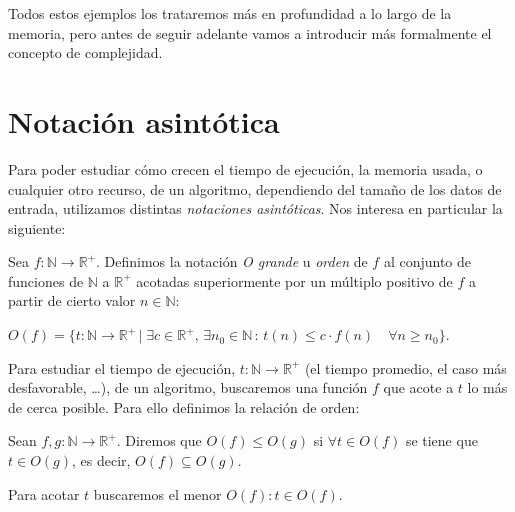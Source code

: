 Todos estos ejemplos los trataremos m\'as en profundidad a lo largo de la memoria, pero antes de seguir adelante vamos a introducir m\'as formalmente el concepto de complejidad.

\hfil

\section{Notación asintótica}

Para poder estudiar cómo crecen el tiempo de ejecución, la memoria usada, o cualquier otro recurso, de un algoritmo, dependiendo del tamaño de los datos de entrada, utilizamos distintas \textit{notaciones asintóticas}. Nos interesa en particular la siguiente:

\begin{definition}
	Sea $f : \mathbb{N} \rightarrow \mathbb{R}^+$. Definimos la notación \textit{O grande} u \textit{orden} de $f$ al conjunto de funciones de $\mathbb{N}$ a $\mathbb{R}^+$ acotadas superiormente por un múltiplo positivo de $f$ a partir de cierto valor $n \in \mathbb{N}$:

	$O(f) = \{t:\mathbb{N} \rightarrow \mathbb{R}^+ \, | \; \exists c \in \mathbb{R}^+,\, \exists
	n_0\in \mathbb{N} \, : \, t(n) \leq c\cdot f(n) \quad \forall n \geq n_0  \}$.

\end{definition}

\hfil

Para estudiar el tiempo de ejecución, $t : \mathbb{N} \rightarrow \mathbb{R}^+$ (el tiempo promedio, el caso más desfavorable, \dots), de un algoritmo, buscaremos una función $f$ que acote a $t$ lo más de cerca posible. Para ello definimos la relación de orden:

\begin{definition}
	Sean $f, g : \mathbb{N} \rightarrow \mathbb{R}^+$.
	Diremos que  $O(f) \leq O(g)$ si $\forall t \in O(f)$ se tiene que $t \in O(g)$, es decir,  $O(f) \subseteq O(g)$.
\end{definition}

Para acotar $t$ buscaremos el menor $O(f) : t\in O(f)$.


